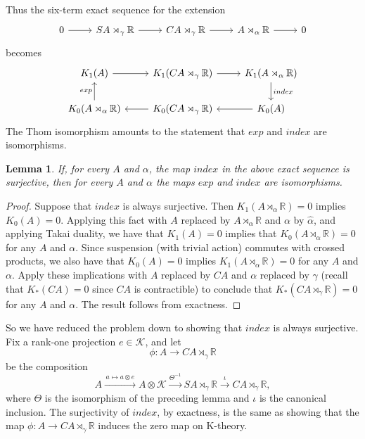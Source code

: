 \documentclass{book}
\newtheorem{lemma}[definition]{Lemma}
\begin{document}
Thus the six-term exact sequence for the extension
\[
  \begin{tikzcd}
    0\arrow[r]&SA\rtimes_\gamma\mathbb{R}\arrow[r]&CA\rtimes_\gamma\mathbb{R}\arrow[r]&A\rtimes_\alpha\mathbb{R}\arrow[r]&0   
  \end{tikzcd}
\]
becomes
\[
  \begin{tikzcd}
    K_1(A)\arrow[r]&K_1(CA\rtimes_\gamma\mathbb{R})\arrow[r]&K_1(A\rtimes_\alpha\mathbb{R})\arrow[d,"index"]\\
    K_0(A\rtimes_\alpha\mathbb{R})\arrow[u,"exp"]&K_0(CA\rtimes_\gamma\mathbb{R})\arrow[l]&K_0(A)\arrow[l]
  \end{tikzcd}
\]
The Thom isomorphism amounts to the statement that \(exp\) and \(index\) are isomorphisms.
\begin{lemma}
  If, for every \(A\) and \(\alpha\), the map \(index\) in the above exact sequence is surjective,
  then for every \(A\) and \(\alpha\) the maps \(exp\) and \(index\) are isomorphisms.
\end{lemma}
\begin{proof}
  Suppose that \(index\) is always surjective. Then \(K_1(A\rtimes_\alpha\mathbb{R})=0\) implies
  \(K_0(A)=0\). Applying this fact with \(A\) replaced by \(A\rtimes_\alpha\mathbb{R}\) and \(\alpha\)
  by \(\hat{\alpha}\), and applying Takai duality, we have that \(K_1(A)=0\) implies that \(K_0(A\rtimes_\alpha\mathbb{R})=0\)
  for any \(A\) and \(\alpha\). Since suspension (with trivial action) commutes with crossed products, we also have that
  \(K_0(A)=0\) implies \(K_1(A\rtimes_\alpha\mathbb{R})=0\) for any \(A\) and \(\alpha\). Apply these implications
  with \(A\) replaced by \(CA\) and \(\alpha\) replaced by \(\gamma\) (recall that \(K_*(CA)=0\) since \(CA\) is contractible) to conclude that \(K_*(CA\rtimes_\gamma\mathbb{R})=0\)
  for any \(A\) and \(\alpha\). The result follows from exactness.
\end{proof}
So we have reduced the problem down to showing that \(index\) is always surjective.
Fix a rank-one projection \(e\in\mathcal K\), and let
\[
  \phi:
  A\longrightarrow CA\rtimes_\gamma\mathbb R
\]
be the composition
\[
  A\xrightarrow{\,a\mapsto a\otimes e\,}
  A\otimes\mathcal K
  \xrightarrow{\Theta^{-1}}
  SA\rtimes_\gamma\mathbb R
  \xrightarrow{\iota}
  CA\rtimes_\gamma\mathbb R,
\]
where \(\Theta\) is the isomorphism of the preceding lemma and
\(\iota\) is the canonical inclusion.
The surjectivity of \(index\), by exactness, is the same as showing that the map \(\phi:A\to CA\rtimes_\gamma\mathbb{R}\) 
induces the zero map on K-theory.\par
\end{document}
